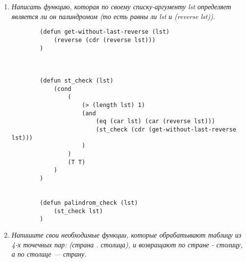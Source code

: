 \begin{enumerate}[wide=0pt]
\begin{lstlisting}
		(defun pass_check (lst)
			(
				or
				(   
					and (= (car lst) 1) (= (cadr lst) 1)
				)
				(   
					and (= (car lst) 6) (= (cadr lst) 6)
				)
			)
		)
		
		
		(defun play-game-second-player ()
			(print "Second player throw: ") 
			(setq second_player (bones_throw))
			(print second_player)
		
			(
				cond 
				(
					(check-easy-win second_player)
					(print "Second player wins") 
				)
				(
					(pass_check second_player)
					(play-game-second-player)
				)
				(
					T
					(
						cond
						(
							(
								>
								(+ (car first_player) (cadr first_player))
								(+ (car second_player) (cadr second_player))
							)
							(print "First player wins") 
						)
						(
							(
								<
								(+ (car first_player) (cadr first_player))
								(+ (car second_player) (cadr second_player))
							)
							(print "Second player wins") 
						)
						(
							T
							(print "Draw in the game")
						)
					)
				)
			)
		)
		
		
		(defun play-game-first-player ()
		
			(print "First player throws: ")
			(setq first_player (bones_throw))
			(print first_player)
		
			(
				cond
				(
					(check-easy-win first_player)
					(print "First player wins")
				)
				(
					(pass_check first_player)
					(play-game-first-player)
				)
				(
					T
					(play-game-second-player)
				)
			)
		
		)
		
		
		(play-game-first-player)
	\end{lstlisting}

	\item  \textit{Написать функцию, которая по своему 
	списку-аргументу lst определяет
	является ли он палиндромом (то есть равны ли lst и (reverse lst)).}
	\begin{lstlisting}
		(defun get-without-last-reverse (lst)
			(reverse (cdr (reverse lst)))
		)



		(defun st_check (lst)
			(cond
				(
					(> (length lst) 1)
					(and
						(eq (car lst) (car (reverse lst)))
						(st_check (cdr (get-without-last-reverse lst)))
					)
				)
				(T T)
			)
		)


		(defun palindrom_check (lst)
			(st_check lst)
		)
	\end{lstlisting}

	\item  \textit{Напишите свои необходимые функции, 
	которые обрабатывают таблицу из
	4-х точечных пар:
	(страна . столица), и возвращают по стране - столицу, а по столице —
	страну.}
	

\end{enumerate}
